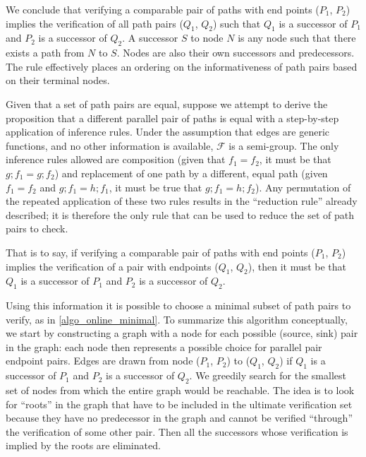 \documentclass[sigplan]{acmart}
\begin{document}
We conclude that verifying a comparable pair of paths with end points ($P_1$, $P_2$) implies the verification of all path pairs ($Q_1$, $Q_2$) such that $Q_1$ is a successor of $P_1$ and $P_2$ is a successor of $Q_2$. A successor $S$ to node $N$ is any node such that there exists a path from $N$ to $S$. Nodes are also their own successors and predecessors.
The rule effectively places an ordering on the informativeness of path pairs based on their terminal nodes.

Given that a set of path pairs are equal, suppose we attempt to derive the proposition that a different parallel pair of paths is equal with a step-by-step application of inference rules.
 Under the assumption that edges are generic functions, and no other information is available, $\mathcal{F}$ is a semi-group.
 The only inference rules allowed are composition (given that $f_1=f_2$, it must be that $g ; f_1 = g ; f_2$) and replacement of one path by a different, equal path (given $f_1=f_2$ and $g ; f_1 = h ; f_1 $, it must be true that $g ; f_1 = h ; f_2$). Any permutation of the repeated application of these two rules results in the ``reduction rule'' already described; it is therefore the only rule that can be used to reduce the set of path pairs to check.

That is to say, if verifying a comparable pair of paths with end points ($P_1$, $P_2$) implies the verification of a pair with endpoints ($Q_1$, $Q_2$), then it must be that $Q_1$ is a successor of $P_1$ and $P_2$ is a successor of $Q_2$. %

Using this information it is possible to choose a minimal subset of path pairs to verify, as in \ref{algo_online_minimal}.
%
To summarize this algorithm conceptually, we start by constructing a graph with a node for each possible (source, sink) pair in the graph: each node then represents a possible choice for parallel pair endpoint pairs. Edges are drawn from node ($P_1$, $P_2$) to ($Q_1$, $Q_2$) if $Q_1$ is a successor of $P_1$ and $P_2$ is a successor of $Q_2$. We greedily search for the smallest set of nodes from which the entire graph would be reachable. The idea is to look for ``roots'' in the graph that have to be included in the ultimate verification set because they have no predecessor in the graph and cannot be verified ``through'' the verification of some other pair. Then all the successors whose verification is implied by the roots are eliminated.
\end{document}
